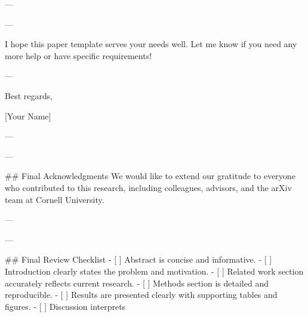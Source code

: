 --- 

---

I hope this paper template serves your needs well. Let me know if you need any more help or have specific requirements! 

--- 

Best regards, 

[Your Name] 

--- 

---

## Final Acknowledgments
We would like to extend our gratitude to everyone who contributed to this research, including colleagues, advisors, and the arXiv team at Cornell University. 

--- 

---

## Final Review Checklist
- [ ] Abstract is concise and informative.
- [ ] Introduction clearly states the problem and motivation.
- [ ] Related work section accurately reflects current research.
- [ ] Methods section is detailed and reproducible.
- [ ] Results are presented clearly with supporting tables and figures.
- [ ] Discussion interprets